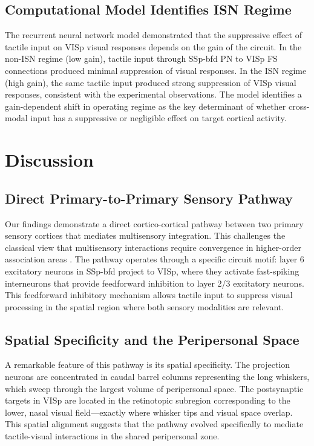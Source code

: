 \documentclass[11pt]{article}
\begin{document}
\subsection{Computational Model Identifies ISN Regime}

The recurrent neural network model demonstrated that the suppressive effect of tactile input on VISp visual responses depends on the gain of the circuit. In the non-ISN regime (low gain), tactile input through SSp-bfd PN to VISp FS connections produced minimal suppression of visual responses. In the ISN regime (high gain), the same tactile input produced strong suppression of VISp visual responses, consistent with the experimental observations. The model identifies a gain-dependent shift in operating regime as the key determinant of whether cross-modal input has a suppressive or negligible effect on target cortical activity.

\section{Discussion}

\subsection{Direct Primary-to-Primary Sensory Pathway}

Our findings demonstrate a direct cortico-cortical pathway between two primary sensory cortices that mediates multisensory integration. This challenges the classical view that multisensory interactions require convergence in higher-order association areas \citep{stein1993merging}. The pathway operates through a specific circuit motif: layer 6 excitatory neurons in SSp-bfd project to VISp, where they activate fast-spiking interneurons that provide feedforward inhibition to layer 2/3 excitatory neurons. This feedforward inhibitory mechanism allows tactile input to suppress visual processing in the spatial region where both sensory modalities are relevant.

\subsection{Spatial Specificity and the Peripersonal Space}

A remarkable feature of this pathway is its spatial specificity. The projection neurons are concentrated in caudal barrel columns representing the long whiskers, which sweep through the largest volume of peripersonal space. The postsynaptic targets in VISp are located in the retinotopic subregion corresponding to the lower, nasal visual field---exactly where whisker tips and visual space overlap. This spatial alignment suggests that the pathway evolved specifically to mediate tactile-visual interactions in the shared peripersonal zone.
\end{document}
